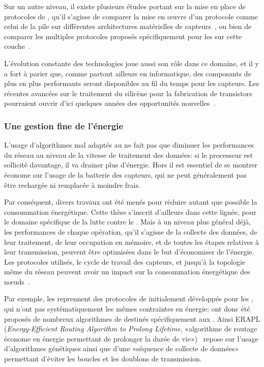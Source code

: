 Sur un autre niveau, il existe plusieurs études portant sur la mise en place de protocoles de , qu'il s'agisse de comparer la mise en œuvre d'un protocole comme celui de la pile \ieeeff sur différentes architectures matérielles de capteurs~\cite{BPCCGF07}, ou bien de comparer les multiples protocoles proposés spécifiquement pour les \rcs sur cette couche~\cite{YB09}.

L'évolution constante des technologies joue aussi son rôle dans ce domaine, et il y a fort à parier que, comme partout ailleurs en informatique, des composants de plus en plus performants seront disponibles au fil du temps pour les capteurs.
Les récentes avancées sur le traitement du silicène pour la fabrication de transistors pourraient ouvrir d'ici quelques années des opportunités nouvelles~\cite{TCCGFDMA15}.

        \subsubsection{Une gestion fine de l'énergie}
L'usage d'algorithmes mal adaptés au \rcs ne fait pas que diminuer les performances du réseau au niveau de la vitesse de traitement des données: si le processeur est sollicité davantage, il va drainer plus d'énergie.
Hors il est essentiel de se montrer économe sur l'usage de la batterie des capteurs, qui ne peut généralement pas être rechargée ni remplacée à moindre frais.

Par conséquent, divers travaux ont été menés pour réduire autant que possible la consommation énergétique.
Cette thèse s'inscrit d'ailleurs dans cette lignée, pour le domaine spécifique de la lutte contre le \dds.
Mais à un niveau plus général déjà, les performances de chaque opération, qu'il s'agisse de la collecte des données, de leur traitement, de leur occupation en mémoire, et de toutes les étapes relatives à leur transmission, peuvent être optimisées dans le but d'économiser de l'énergie.
Les protocoles utilisés, le cycle de travail des capteurs, et jusqu'à la topologie même du réseau peuvent avoir un impact sur la consommation énergétique des nœuds~\cite{ACFP09}.

Par exemple, les \rcs reprennent des protocoles de  initialement développés pour les \wanet, qui n'ont pas systématiquement les mêmes contraintes en énergie; ont donc été proposés de nombreux algorithmes de  destinés spécifiquement aux \rcs.
Ainsi ERAPL (\textit{Energy-Efficient Routing Algorithm to Prolong Lifetime}, «algorithme de routage économe en énergie permettant de prolonger la durée de vie»)~\cite{ZWPT10} repose sur l'usage d'algorithmes génétiques ainsi que d'une «séquence de collecte de données» permettant d'éviter les boucles et les doublons de transmission.

